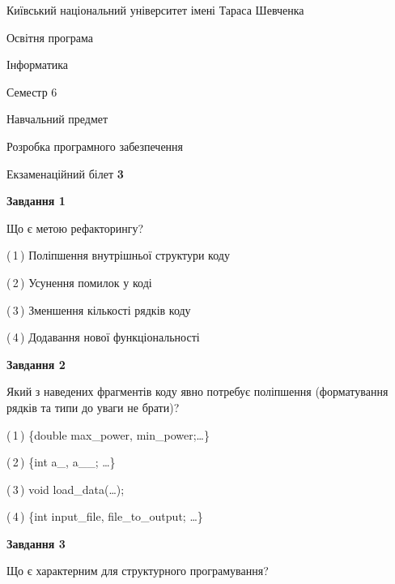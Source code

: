 \documentclass[10pt, ukrainian]{article}
\begin{document}
{{\begin {small}\par
{ \center  Київський національний університет імені Тараса Шевченка \par}
{\parbox {5 cm}{Освітня програма \hfill}{\parbox {7 cm}{Інформатика \hfill}}\parbox {6 cm}{\hfill Семестр 6}}\par
{\parbox {5 cm} {Навчальний предмет \hfill}\parbox {7 cm}{Розробка програмного забезпечення \hfill}\parbox {6cm}{\hfill}\par}\vspace{-7pt} \end{small}}{\center Екзаменаційний білет \No \textbf
{ 3 }\par}}
{
\begin {large}
{\begin {center}\textbf{Завдання 1}\end {center}}\par
Що є метою рефакторингу?\par
\vspace{2mm}



(\,1\,) Поліпшення внутрішньої структури коду%



(\,2\,) Усунення помилок у коді%



(\,3\,) Зменшення кількості рядків коду%



(\,4\,) Додавання нової функціональності%


{\begin {center}\textbf{Завдання 2}\end {center}}\par
Який з наведених фрагментів коду явно потребує поліпшення (форматування рядків та типи до уваги не брати)?\par
\vspace{2mm}



(\,1\,) \{double max\_power, min\_power;…\} %



(\,2\,) \{int a\_, a\_\_; …\}%



(\,3\,) void load\_data(…);%



(\,4\,) \{int input\_file, file\_to\_output; …\}%


{\begin {center}\textbf{Завдання 3}\end {center}}\par
Що є характерним для структурного програмування?\par
\vspace{2mm}




\end{large}}
\end{document}
